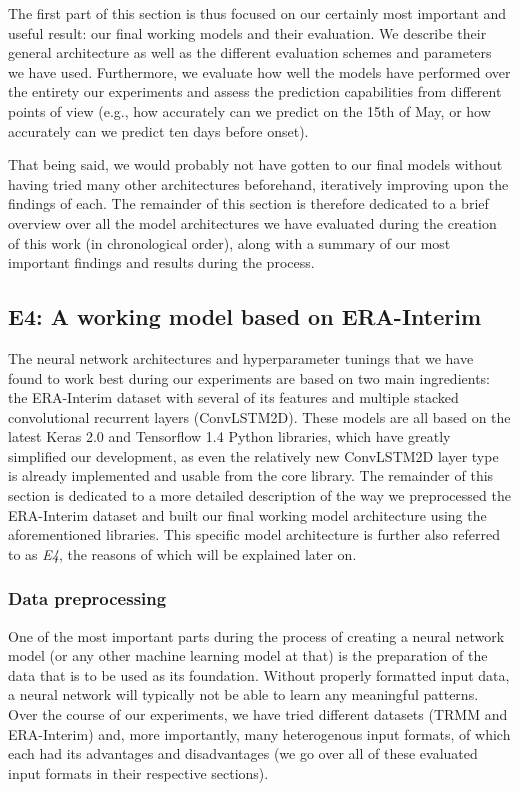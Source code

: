 The first part of this section is thus focused on our certainly most important and useful result: our final working models and their evaluation. We describe their general architecture as well as the different evaluation schemes and parameters we have used. Furthermore, we evaluate how well the models have performed over the entirety our experiments and assess the prediction capabilities from different points of view (e.g., how accurately can we predict on the 15th of May, or how accurately can we predict ten days before onset).

That being said, we would probably not have gotten to our final models without having tried many other architectures beforehand, iteratively improving upon the findings of each. The remainder of this section is therefore dedicated to a brief overview over all the model architectures we have evaluated during the creation of this work (in chronological order), along with a summary of our most important findings and results during the process.

\subsection{E4: A working model based on ERA-Interim}
\label{sst:final_model}
The neural network architectures and hyperparameter tunings that we have found to work best during our experiments are based on two main ingredients: the ERA-Interim dataset with several of its features and multiple stacked convolutional recurrent layers (ConvLSTM2D). These models are all based on the latest Keras 2.0 and Tensorflow 1.4 Python libraries, which have greatly simplified our development, as even the relatively new ConvLSTM2D layer type is already implemented and usable from the core library. The remainder of this section is dedicated to a more detailed description of the way we preprocessed the ERA-Interim dataset and built our final working model architecture using the aforementioned libraries. This specific model architecture is further also referred to as \textit{E4}, the reasons of which will be explained later on.

\subsubsection{Data preprocessing}
One of the most important parts during the process of creating a neural network model (or any other machine learning model at that) is the preparation of the data that is to be used as its foundation. Without properly formatted input data, a neural network will typically not be able to learn any meaningful patterns. Over the course of our experiments, we have tried different datasets (TRMM and ERA-Interim) and, more importantly, many heterogenous input formats, of which each had its advantages and disadvantages (we go over all of these evaluated input formats in their respective sections).


